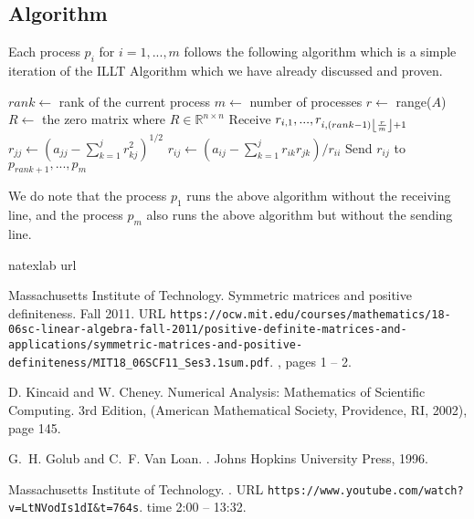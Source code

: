 \documentclass[11pt]{article}
\DeclarePairedDelimiter\floor{\lfloor}{\rfloor}
\theoremstyle{definition}
\begin{document}
\subsection{Algorithm}
Each process $p_i$ for $i=1,...,m$ follows the following algorithm which is a simple iteration of the ILLT Algorithm which we have already discussed and proven.
\begin{algorithmic}
\State $rank\gets$ rank of the current process
\State $m\gets$ number of processes
\State $r\gets$ range($A$)
\State $R\gets$ the zero matrix where $R\in\mathbb{R}^{n\times n}$
			\State Receive $r_{i,1},...,r_{i,(rank-1)\floor*{\frac{r}{m}}+1}$
		\EndIf
			\State $r_{jj}\gets (a_{jj}-\sum_{k=1}^{j}r_{kj}^2)^{1/2}$
		\Else
    			\State $r_{ij}\gets (a_{ij}-\sum_{k=1}^{j}r_{ik}r_{jk})/r_{ii}$
    		\EndIf
		\EndIf
		\State Send $r_{ij}$ to $p_{rank+1},...,p_m$
	\EndFor
\EndFor
\end{algorithmic}
We do note that the process $p_1$ runs the above algorithm without the receiving line, and the process $p_m$ also runs the above algorithm but without the sending line.

\pagebreak

\begin{thebibliography}{9}
\expandafter\ifx\csname natexlab\endcsname\relax\def\natexlab#1{#1}\fi
\expandafter\ifx\csname url\endcsname\relax
  \def\url#1{{\tt #1}}\fi

Massachusetts Institute of Technology.
\newblock Symmetric matrices and positive definiteness.
\newblock Fall 2011.
\newblock URL \url{https://ocw.mit.edu/courses/mathematics/18-06sc-linear-algebra-fall-2011/positive-definite-matrices-and-applications/symmetric-matrices-and-positive-definiteness/MIT18\_06SCF11\_Ses3.1sum.pdf}.
\newblock [20/4/2020], pages 1 -- 2.

D. Kincaid and W. Cheney.
\newblock Numerical Analysis: Mathematics of Scientific Computing.
\newblock 3rd Edition, (American Mathematical Society, Providence, RI, 2002), page 145.
  
G.~H. Golub and C.~F. {Van Loan}.
.
\newblock Johns Hopkins University Press, 1996.

Massachusetts Institute of Technology.
.
\newblock URL \url{https://www.youtube.com/watch?v=LtNVodIs1dI&t=764s}.
\newblock time 2:00 -- 13:32.
\end{thebibliography}
\end{document}
